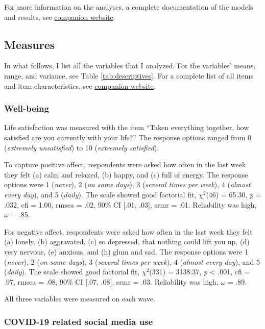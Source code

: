 \documentclass[
  english,
  man,mask,floatsintext]{apa6}
\begin{document}
For more information on the analyses, a complete documentation of the models and results, see \href{https://tdienlin.github.io/Austrian_Corona_Panel/index.html}{companion website}.

\hypertarget{measures}{%
\subsection{Measures}\label{measures}}

In what follows, I list all the variables that I analyzed.
For the variables' means, range, and variance, see Table \ref{tab:descriptives}.
For a complete list of all items and item characteristics, see \href{https://tdienlin.github.io/Austrian_Corona_Panel/index.html}{companion website}.

\hypertarget{well-being}{%
\subsubsection{Well-being}\label{well-being}}

Life satisfaction was measured with the item ``Taken everything together, how satisfied are you currently with your life?''
The response options ranged from 0 (\emph{extremely unsatisfied}) to 10 (\emph{extremely satisfied}).

To capture positive affect, respondents were asked how often in the last week they felt (a) calm and relaxed, (b) happy, and (c) full of energy.
The response options were 1 (\emph{never}), 2 (\emph{on some days}), 3 (\emph{several times per week}), 4 (\emph{almost every day}), and 5 (\emph{daily}).
The scale showed good factorial fit, \(\chi^2\)(46) = 65.30, \textit{p} = .032, cfi = 1.00, rmsea = .02, 90\% CI {[}.01, .03{]}, srmr = .01.
Reliability was high, \(\omega\) = .85.

For negative affect, respondents were asked how often in the last week they felt (a) lonely, (b) aggravated, (c) so depressed, that nothing could lift you up, (d) very nervous, (e) anxious, and (h) glum and sad.
The response options were 1 (\emph{never}), 2 (\emph{on some days}), 3 (\emph{several times per week}), 4 (\emph{almost every day}), and 5 (\emph{daily}).
The scale showed good factorial fit, \(\chi^2\)(331) = 3138.37, \textit{p} \textless{} .001, cfi = .97, rmsea = .08, 90\% CI {[}.07, .08{]}, srmr = .03.
Reliability was high, \(\omega\) = .89.

All three variables were measured on each wave.

\hypertarget{covid-19-related-social-media-use}{%
\subsubsection{COVID-19 related social media use}\label{covid-19-related-social-media-use}}
\end{document}
